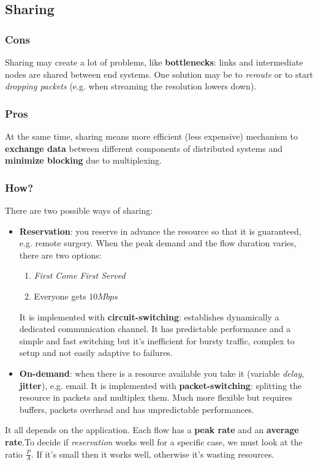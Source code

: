 \subsection{Sharing}
\subsubsection{Cons}
Sharing may create a lot of problems, like \textbf{bottlenecks}: links and intermediate nodes are shared between end systems. One solution may be to \textit{reroute} or to start \textit{dropping packets} (e.g. when streaming the resolution lowers down).
\subsubsection{Pros}
At the same time, sharing means more efficient (less expensive) mechanism to \textbf{exchange data} between different components of distributed systems and \textbf{minimize blocking} due to multiplexing.

\subsubsection{How?}
There are two possible ways of sharing:
\begin{itemize}
	\item \textbf{Reservation}: you reserve in advance the resource so that it is guaranteed, e.g. remote surgery. When the peak demand and the flow duration varies, there are two options:
	\begin{enumerate}
		\item \textit{First Come First Served}
		\item Everyone gets $10Mbps$
	\end{enumerate}
	It is implemented with \textbf{circuit-switching}: establishes dynamically a dedicated communication channel. It has predictable performance and a simple and fast switching but it's inefficient for bursty traffic, complex to setup and not easily adaptive to failures.
	
	\item \textbf{On-demand}: when there is a resource available you take it (variable \textit{delay}, \textbf{jitter}), e.g. email. It is implemented with \textbf{packet-switching}: splitting the resource in packets and multiplex them. Much more flexible but requires buffers, packets overhead and has unpredictable performances.
\end{itemize}

\begin{observation}
	It all depends on the application. Each flow has a \textbf{peak rate} and an \textbf{average rate}.To decide if \textit{reservation} works well for a specific case, we must look at the ratio $\frac{P}{A}$. If it's small then it works well, otherwise it's wasting resources.
\end{observation}
